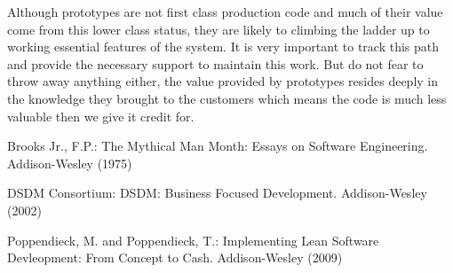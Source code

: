 \documentclass[lnbip]{svmultln}
\begin{document}
Although prototypes are not first class production code and much of
their value come from this lower class status, they are likely to
climbing the ladder up to working essential features of the system. It
is very important to track this path and provide the necessary support
to maintain this work. But do not fear to throw away anything either,
the value provided by prototypes resides deeply in the knowledge they
brought to the customers which means the code is much less valuable
then we give it credit for.

%
%
\begin{thebibliography}{5}

 Brooks Jr., F.P.: The Mythical Man Month: Essays
  on Software Engineering. Addison-Wesley (1975)

 DSDM Consortium: DSDM: Business Focused
  Development. Addison-Wesley (2002)




 Poppendieck, M. and Poppendieck, T.:
  Implementing Lean Software Devleopment: From Concept to
  Cash. Addison-Wesley (2009)

\end{thebibliography}
%
\end{document}

